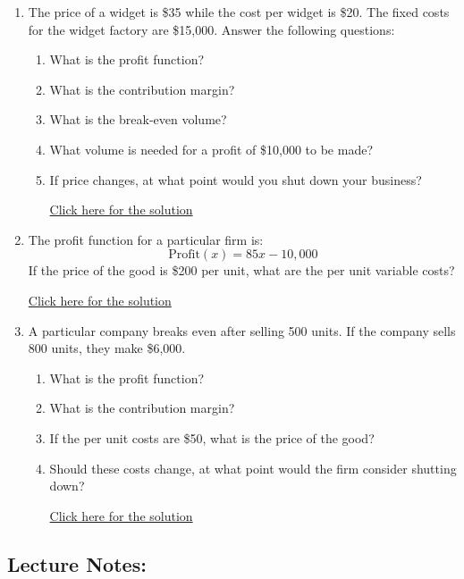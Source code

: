 \documentclass[
]{book}
\providecommand{\tightlist}{%
  \setlength{\itemsep}{0pt}\setlength{\parskip}{0pt}}
\begin{document}
\begin{enumerate}
\def\labelenumi{\arabic{enumi}.}
\tightlist
\item
  The price of a widget is \$35 while the cost per widget is \$20. The fixed costs for the widget factory are \$15,000. Answer the following questions:

  \begin{enumerate}
  \def\labelenumii{\alph{enumii}.}
  \tightlist
  \item
    What is the profit function?
  \item
    What is the contribution margin?
  \item
    What is the break-even volume?
  \item
    What volume is needed for a profit of \$10,000 to be made?
  \item
    If price changes, at what point would you shut down your business?

    \href{https://youtu.be/sF3tnZ02KkU}{Click here for the solution}
  \end{enumerate}
\item
  The profit function for a particular firm is:
  \[
      \text{Profit}(x) = 85x - 10,\!000
      \]
  If the price of the good is \$200 per unit, what are the per unit variable costs?

  \href{https://youtu.be/KBgF9U4clp8}{Click here for the solution}
\item
  A particular company breaks even after selling 500 units. If the company sells 800 units, they make \$6,000.

  \begin{enumerate}
  \def\labelenumii{\alph{enumii}.}
  \tightlist
  \item
    What is the profit function?
  \item
    What is the contribution margin?
  \item
    If the per unit costs are \$50, what is the price of the good?
  \item
    Should these costs change, at what point would the firm consider shutting down?

    \href{https://youtu.be/gxVwF3i6Kr8}{Click here for the solution}
  \end{enumerate}
\end{enumerate}

\subsection*{Lecture Notes:}\label{lecture-notes-5}
\end{document}

